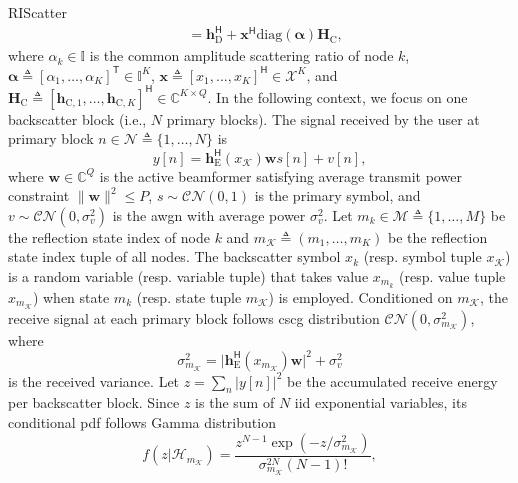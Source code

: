 \documentclass[journal,12pt,onecolumn,draftclsnofoot]{IEEEtran}
\theoremstyle{remark}
\begin{document}
\begin{section}{RIScatter}
\begin{subequations}
\begin{align}
			 & = \boldsymbol{h}_{\text{D}}^\mathsf{H} + \boldsymbol{x}^\mathsf{H} \mathrm{diag}(\boldsymbol{\alpha}) \boldsymbol{H}_{\text{C}}, \label{eq:equivalent_channel_ris}
		\end{align}
	\end{subequations}
	where $\alpha_k \in \mathbb{I}$ is the common amplitude scattering ratio of node $k$, $\boldsymbol{\alpha} \triangleq [\alpha_1,\ldots,\alpha_K]^\mathsf{T} \in \mathbb{I}^{K}$, $\boldsymbol{x} \triangleq [x_1,\ldots,x_K]^\mathsf{H} \in \mathcal{X}^{K}$, and $\boldsymbol{H}_{\text{C}} \triangleq [\boldsymbol{h}_{\text{C},1},\ldots,\boldsymbol{h}_{\text{C},K}]^\mathsf{H} \in \mathbb{C}^{K \times Q}$.
	In the following context, we focus on one backscatter block (i.e., $N$ primary blocks).
	The signal received by the user at primary block $n \in \mathcal{N} \triangleq \{1,\ldots,N\}$ is
	\begin{equation}
		y[n] = \boldsymbol{h}_{\text{E}}^\mathsf{H}(x_{\mathcal{K}}) \boldsymbol{w} s[n] + v[n],
		\label{eq:receive_signal}
	\end{equation}
	where $\boldsymbol{w} \in \mathbb{C}^{Q}$ is the active beamformer satisfying average transmit power constraint $\lVert \boldsymbol{w} \rVert^2 \le P$, $s \sim \mathcal{CN}(0,1)$ is the primary symbol, and $v \sim \mathcal{CN}(0,\sigma_v^2)$ is the \gls{awgn} with average power $\sigma_v^2$.
	Let $m_k \in \mathcal{M} \triangleq \{1,\ldots,M\}$ be the reflection state index of node $k$ and $m_{\mathcal{K}} \triangleq (m_1,\ldots,m_K)$ be the reflection state index tuple of all nodes.
	The backscatter symbol $x_k$ (resp. symbol tuple $x_{\mathcal{K}}$) is a random variable (resp. variable tuple) that takes value $x_{m_k}$ (resp. value tuple $x_{m_{\mathcal{K}}}$) when state $m_k$ (resp. state tuple $m_{\mathcal{K}}$) is employed.
	Conditioned on $m_{\mathcal{K}}$, the receive signal at each primary block follows \gls{cscg} distribution $\mathcal{CN}(0,\sigma_{m_{\mathcal{K}}}^2)$, where
	\begin{equation}
		\sigma_{m_{\mathcal{K}}}^2 = \lvert \boldsymbol{h}_{\text{E}}^\mathsf{H}(x_{m_{\mathcal{K}}}) \boldsymbol{w} \rvert^2 + \sigma_v^2
		\label{eq:receive_variance}
	\end{equation}
	is the received variance.
	Let $z=\sum_{n} \bigl\lvert y[n] \bigr\rvert^2$ be the accumulated receive energy per backscatter block.
	Since $z$ is the sum of $N$ \gls{iid} exponential variables, its conditional \gls{pdf} follows Gamma distribution
	\begin{equation}
		f(z|\mathcal{H}_{m_{\mathcal{K}}}) = \frac{z^{N-1} \exp(-z/\sigma_{m_{\mathcal{K}}}^2)}{\sigma_{m_{\mathcal{K}}}^{2N} (N-1)!},

\end{equation}
\end{section}
\end{document}
